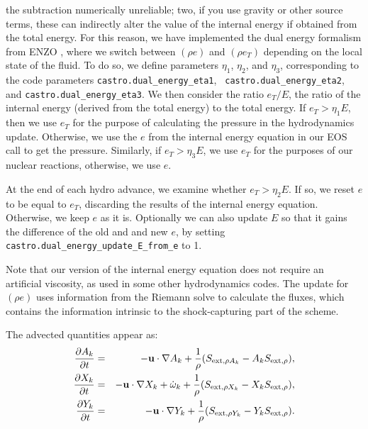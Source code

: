the subtraction numerically unreliable; two, if you use gravity or
other source terms, these can indirectly alter the value of the
internal energy if obtained from the total energy. For this reason, we
have implemented the dual energy formalism from ENZO
\cite{bryan:1995,bryan:2014}, where we switch between $(\rho e)$ and
$(\rho e_T)$ depending on the local state of the fluid. To do so, we
define parameters $\eta_1$, $\eta_2$, and $\eta_3$, corresponding to
the code parameters {\tt castro.dual\_energy\_eta1}, {\tt
  castro.dual\_energy\_eta2}, and {\tt castro.dual\_energy\_eta3}. We
then consider the ratio $e_T / E$, the ratio of the internal energy
(derived from the total energy) to the total energy. If $e_T > \eta_1
E$, then we use $e_T$ for the purpose of calculating the pressure in
the hydrodynamics update. Otherwise, we use the $e$ from the internal
energy equation in our EOS call to get the pressure. Similarly, if
$e_T > \eta_3 E$, we use $e_T$ for the purposes of our nuclear
reactions, otherwise, we use $e$.

At the end of each hydro advance, we examine whether $e_T > \eta_2 E$. If so, we reset
$e$ to be equal to $e_T$, discarding the results of the internal energy equation. Otherwise,
we keep $e$ as it is. Optionally we can also update $E$ so that it gains the difference of the
old and and new $e$, by setting {\tt castro.dual\_energy\_update\_E\_from\_e} to 1.

Note that our version of the internal energy equation does not require an artificial viscosity,
as used in some other hydrodynamics codes. The update for $(\rho e)$ uses information from
the Riemann solve to calculate the fluxes, which contains the information intrinsic to the
shock-capturing part of the scheme.

The advected quantities appear as:
\begin{eqnarray}
\frac{\partial A_k}{\partial t} &=& -{\bf u}\cdot\nabla A_k + \frac{1}{\rho}
                                     ( S_{{\rm ext},\rho A_k} - A_k S_{{\rm ext},\rho} ), \\
\frac{\partial X_k}{\partial t} &=& -{\bf u}\cdot\nabla X_k + \dot\omega_k + \frac{1}{\rho}
                                     ( S_{{\rm ext},\rho X_k}  - X_k S_{{\rm ext},\rho} ), \\
\frac{\partial Y_k}{\partial t} &=& -{\bf u}\cdot\nabla Y_k + \frac{1}{\rho} 
                                     ( S_{{\rm ext},\rho Y_k}  - Y_k S_{{\rm ext},\rho} ).
\end{eqnarray}


